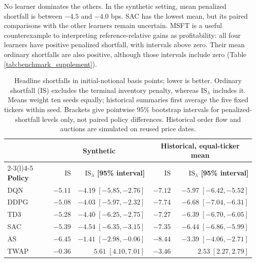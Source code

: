 \documentclass[11pt]{article}
\begin{document}
No learner dominates the others. In the synthetic setting, mean penalized shortfall is between $-4.5$ and $-4.0$ bps. SAC has the lowest mean, but its paired comparisons with the other learners remain uncertain. MSFT is a useful counterexample to interpreting reference-relative gains as profitability: all four learners have positive penalized shortfall, with intervals above zero. Their mean ordinary shortfalls are also positive, although those intervals include zero (Table \ref{tab:benchmark_supplement}).\vspace{0.5em}

\begin{table}[!htbp]
\centering
\setlength{\tabcolsep}{7pt}
\begin{tabular}{@{}lrrrr@{}}
\toprule
& \multicolumn{2}{c}{\textbf{Synthetic}} & \multicolumn{2}{c}{\textbf{Historical, equal-ticker mean}} \\
\cmidrule(lr){2-3}\cmidrule(l){4-5}
\textbf{Policy} & {\boldmath$\mathrm{IS}$} & \textbf{\boldmath$\mathrm{IS}_\lambda$ [95\% interval]} & {\boldmath$\mathrm{IS}$} & \textbf{\boldmath$\mathrm{IS}_\lambda$ [95\% interval]} \\
\midrule
DQN & $-5.11$ & $-4.19\;[-5.85,-2.76]$ & $-7.12$ & $-5.97\;[-6.42,-5.52]$ \\
DDPG & $-5.08$ & $-4.03\;[-5.97,-2.32]$ & $-7.74$ & $-6.68\;[-7.04,-6.31]$ \\
TD3 & $-5.28$ & $-4.40\;[-6.25,-2.75]$ & $-7.27$ & $-6.39\;[-6.70,-6.05]$ \\
SAC & $-5.39$ & $-4.54\;[-6.35,-3.15]$ & $-7.35$ & $-6.44\;[-6.86,-5.99]$ \\
\midrule
AS & $-6.45$ & $-1.41\;[-2.98,-0.06]$ & $-8.44$ & $-3.39\;[-4.06,-2.71]$ \\
TWAP & $-0.36$ & $5.61\;[4.10,7.01]$ & $-3.46$ & $2.53\;[2.27,2.79]$ \\
\bottomrule
\end{tabular}
\caption{Headline shortfalls in initial-notional basis points; lower is better. Ordinary shortfall ($\mathrm{IS}$) excludes the terminal inventory penalty, whereas $\mathrm{IS}_\lambda$ includes it. Means weight ten seeds equally; historical summaries first average the five fixed tickers within seed. Brackets give pointwise 95\% bootstrap intervals for penalized-shortfall levels only, not paired policy differences. Historical order flow and auctions are simulated on reused price dates.}
\label{tab:economic_performance}
\end{table}


\end{document}
